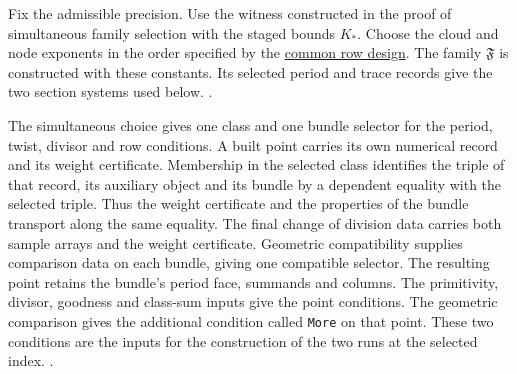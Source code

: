 Fix the admissible precision. Use the witness constructed in the
proof of simultaneous family selection with the staged bounds \(K_*\).
Choose the cloud and node exponents in the order specified by the
\hyperlink{proof.section-run-design}{common row design}.
The family \(\mathfrak F\) is constructed with these constants.
Its selected period and trace records give the two section systems
used below.
.

The simultaneous choice gives one class and one bundle selector for
the period, twist, divisor and row conditions. A built point carries
its own numerical record and its weight certificate. Membership in
the selected class identifies the triple of that record, its auxiliary
object and its bundle by a dependent equality with the selected triple.
Thus the weight certificate and the properties of the bundle transport
along the same equality. The final change of division data carries
both sample arrays and the weight certificate. Geometric compatibility
supplies comparison data on each bundle, giving one compatible
selector. The resulting point retains the bundle's period face,
summands and columns. The primitivity, divisor, goodness and class-sum
inputs give the point conditions. The geometric comparison gives the
additional condition called \texttt{More} on that point. These two
conditions are the inputs for the construction of the two runs at the
selected index.
.

